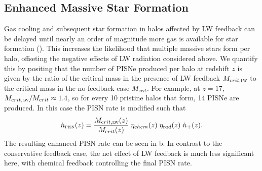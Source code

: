 \documentclass[../thesis.tex]{subfiles}
\begin{document}
\subsection{Enhanced Massive Star Formation}
Gas cooling and subsequent star formation in halos affected by LW
feedback can be delayed until nearly an order of magnitude more gas is
available for star formation (). This increases the
likelihood that multiple massive stars form per halo, offseting the
negative effects of LW radiation considered above.  We quantify this
by positing that the number of PISNe produced per halo at redshift $z$
is given by the ratio of the critical mass in the presence of LW
feedback $M_{\mathrm crit, \textsc{lw}}$ to the critical mass in the
no-feedback case $M_{\mathrm crit}$.  For example, at $z=17$, $M_{\mathrm
  crit, \textsc{lw}} / M_{\mathrm crit} \approx 1.4$, so for every 10
pristine halos that form, 14 PISNe are produced.  In this case the
PISN rate is modified such that
\begin{equation}
\dot{n}_{\textsc{pisn}}(z) = \frac{M_{\mathrm crit, \textsc{lw}}(z)}{M_{\mathrm crit}(z)} \;
\eta_{\mathrm chem}(z) \; \eta_{\mathrm rad}(z) \; \dot{n}_{+}(z).
\label{pisnrate2}
\end{equation}
The resulting enhanced PISN rate can be seen in b.  In
contrast to the conservative feedback case, the net effect of LW
feedback is much less significant here, with chemical feedback
controlling the final PISN rate.
\end{document}
